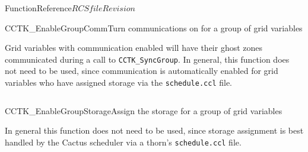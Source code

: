 \begin{cactuspart}{FunctionReference}{$RCSfile$}{$Revision$}

\begin{CCTKFunc}{CCTK\_EnableGroupComm}{Turn communications on for a group of grid variables}
\label{CCTK-EnableGroupComm}
\showcargs
\begin{params}
\end{params}
\begin{discussion}
Grid variables with communication enabled will have their ghost zones communicated during a call
to {\tt CCTK\_SyncGroup}. In general, this function does not need to be used, since communication
is automatically enabled for grid variables who have assigned storage via the {\tt schedule.ccl}
file.
\end{discussion}
\begin{examples}
\begin{tabular}{@{}p{3cm}cp{11cm}}
\end{tabular}
\end{examples}
\begin{errorcodes}
\end{errorcodes}
\end{CCTKFunc}

\begin{CCTKFunc}{CCTK\_EnableGroupStorage}{Assign the storage for a group of grid variables}
\label{CCTK-EnableGroupStorage}
\showcargs
\begin{params}
\end{params}
\begin{discussion}
In general this function does not need to be used, since storage assignment is best handled by
the Cactus scheduler via a thorn's {\tt schedule.ccl} file.
\end{discussion}
\begin{examples}
\begin{tabular}{@{}p{3cm}cp{11cm}}
\end{tabular}
\end{examples}
\begin{errorcodes}
\end{errorcodes}
\end{CCTKFunc}


\end{cactuspart}
